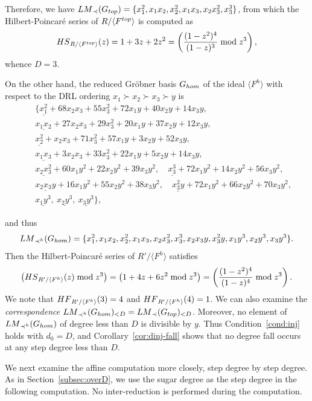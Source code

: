 \documentclass{article}
\theoremstyle{definition}
\theoremstyle{plain}
\theoremstyle{plain}
\theoremstyle{plain}
\theoremstyle{plain}
\numberwithin{equation}{subsection}
\begin{document}
\noindent
Therefore, we have ${\rm LM}_{\prec}(G_{\rm top})=\{x_1^2,x_1x_2,x_2^2,x_1x_3,x_2x_3^2,x_3^3\}$, from which the Hilbert-Poincar\'e series of $R/\langle F^{\rm top}\rangle$ is computed as
\[
{\rm HS}_{R/\langle F^{\rm top}\rangle}(z) =1 + 3z + 2z^2 =\left( \frac{(1-z^2)^4}{(1-z)^3}\bmod{z^3} \right),
\]
whence $D=3$. 

On the other hand, the reduced Gr\"obner basis $G_{\rm hom}$ of the ideal $\langle F^h\rangle$ with respect to the DRL ordering $x_1\succ x_2\succ x_3\succ y$ is 
{\small
\begin{eqnarray*}
&& \{
\underline{x_1^2}+68x_2x_3+55x_3^2+72x_1y+40x_2y+14x_3y,\\
&& \underline{x_1x_2}+27x_2x_3+29x_3^2+20x_1y+37x_2y+12x_3y,\\
&& \underline{x_2^2}+x_2x_3+71x_3^2+57x_1y+3x_2y+52x_3y,\\
&& \underline{x_1x_3}+3x_2x_3+33x_3^2+22x_1y+5x_2y+14x_3y,\\
&& \underline{x_2x_3^2}+60x_1y^2+22x_2y^2+39x_3y^2,\quad \underline{x_3^3}+72x_1y^2+14x_2y^2+56x_3y^2,\\
&& \underline{x_2x_3y}+16x_1y^2+55x_2y^2+38x_3y^2,\quad \underline{x_3^2y}+72x_1y^2+66x_2y^2+70x_3y^2,\\
&& \underline{x_1y^3},\ \underline{x_2y^3},\ \underline{x_3y^3}
\},
\end{eqnarray*}}

\noindent
and thus 
\[
{\rm LM}_{\prec^h}(G_{\rm hom})=\{x_1^2,x_1x_2,x_2^2,x_1x_3,x_2x_3^2,x_3^3,x_2x_3y,x_3^2y,x_1y^3,x_2y^3,x_3y^3\}.
\]
Then the Hilbert-Poincar\'e series of $R'/\langle F^h\rangle$ satisfies
\[
\left( {\rm HS}_{R'/\langle F^{h}\rangle}(z) \bmod{z^3} \right)
=\left( 1+4z+6z^2 \bmod{z^3} \right)= \left( \frac{(1-z^2)^4}{(1-z)^4}\bmod{z^3} \right).
\]
We note that ${\rm HF}_{R'/\langle F^h\rangle}(3)=4$ and ${\rm HF}_{R'/\langle F^h\rangle}(4)=1$.
We can also examine the {\em correspondence} ${\rm LM}_{\prec^h}(G_{\rm hom})_{<D}={\rm LM}_{\prec}(G_{\rm top})_{<D}$.
Moreover, no element of ${\rm LM}_{\prec^h}(G_{\rm hom})$ of degree less than $D$ is divisible by $y$.
Thus Condition~\ref{cond:inj} holds with $d_0=D$, and Corollary~\ref{cor:dinj-fall} shows that no degree fall occurs at any step degree less than $D$.

\medskip

We next examine the affine computation more closely, step degree by
step degree.
As in Section~\ref{subsec:overD}, we use the sugar degree as the
step degree in the following computation.
No inter-reduction is performed during the computation.
\end{document}
